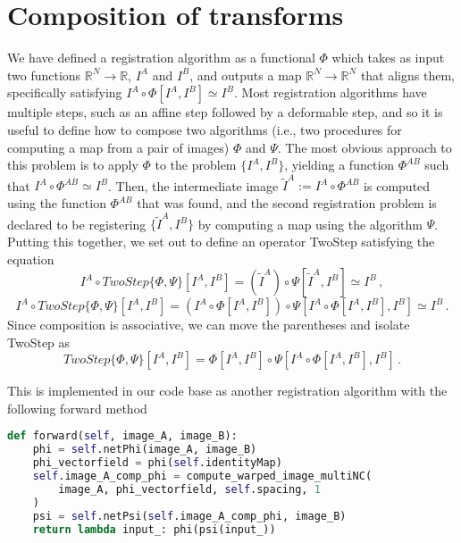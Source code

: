 \section{Composition of transforms}
We have defined a registration algorithm as a functional $\Phi$ which takes as input two functions $\mathbb{R}^N \rightarrow \mathbb{R}$,
$I^{A}$ and $I^B$, and outputs a map $\mathbb{R}^N \rightarrow \mathbb{R}^N$ that aligns them, specifically satisfying $I^A \circ \Phi[I^A, I^B] \simeq I^B$.
Most registration algorithms have multiple steps, such as an affine step followed by a deformable step, and so it is useful to define how to compose two algorithms (i.e., two procedures for computing a map from a pair of images) $\Phi$ and $\Psi$. 
The most obvious approach to this problem is to apply $\Phi$ to the problem $\{I^A, I^B\}$, yielding a function  $\Phi^{AB}$ such that $I^A \circ \Phi^{AB} \simeq I^B$. Then, the intermediate image $\tilde{I}^A := I^A \circ \Phi^{AB}$ is computed using the function $\Phi^{AB}$ that was found, and the second registration problem is declared to be registering $\{\tilde{I}^A, I^B\}$ by computing a map using the algorithm $\Psi$.
Putting this together, we set out to define an operator TwoStep satisfying the equation
\begin{equation}
I^A \circ TwoStep\{\Phi, \Psi\}[I^{A}, I^B] = (\tilde{I}^{A}) \circ \Psi[\tilde{I}^A, I^B] \simeq I^B \,,
\end{equation}
\begin{equation}
I^A \circ TwoStep\{\Phi, \Psi\}[I^{A}, I^B] = (I^{A} \circ \Phi[I^A, I^B]) \circ \Psi[I^A \circ \Phi[I^A, I^B], I^B] \simeq I^B \,.
\end{equation}
Since composition is associative, we can move the parentheses and isolate TwoStep as 
\begin{equation}
TwoStep\{\Phi, \Psi\}[I^{A}, I^B] = \Phi[I^A, I^B] \circ \Psi[I^A \circ \Phi[I^A, I^B], I^B] \,.
\end{equation}
    
\noindent This is implemented in our code base as another registration algorithm with the following forward method 
\begin{lstlisting}[language=Python]
def forward(self, image_A, image_B):
    phi = self.netPhi(image_A, image_B)
    phi_vectorfield = phi(self.identityMap)
    self.image_A_comp_phi = compute_warped_image_multiNC(
        image_A, phi_vectorfield, self.spacing, 1
    )
    psi = self.netPsi(self.image_A_comp_phi, image_B)
    return lambda input_: phi(psi(input_))
\end{lstlisting}

